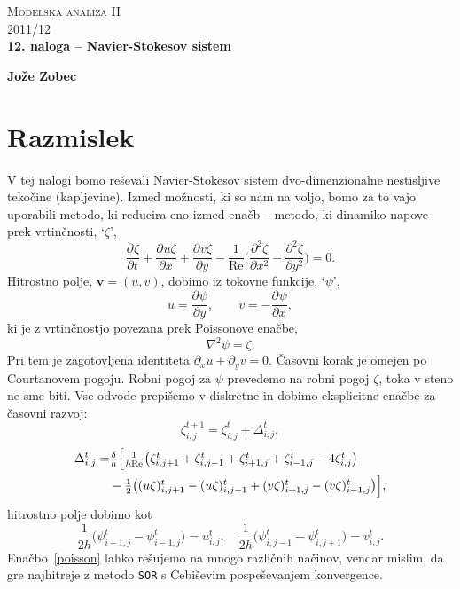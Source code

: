 \documentclass[a4 paper, 12pt]{article}
\renewcommand{\d}{
    \ensuremath{\delta}
}
\newcommand{\der}[3][]{
    \ensuremath{ \frac{\partial^{#1} #2}{\partial #3^{#1}} }
}
\renewcommand{\Re}{
    \ensuremath{\mathrm{Re}}
}
\newcommand{\sfrac}[2]{
    \ensuremath{\textstyle{\frac{#1}{#2}}}
}
\newcommand{\z}{
    \ensuremath{\zeta}
}
\newcommand{\V}{
    \ensuremath{\mathbf{v}}
}
\begin{document}
\begin{center}
\textsc{Modelska analiza II}\\
\textsc{2011/12}\\[0.5cm]
\textbf{12. naloga -- Navier-Stokesov sistem}
\end{center}
\begin{flushright}
\textbf{Jože Zobec}\\
\end{flushright}

\section{Razmislek}

V tej nalogi bomo re\v sevali Navier-Stokesov sistem dvo-dimenzionalne nestisljive
teko\v cine (kapljevine). Izmed mo\v znosti, ki so nam na voljo, bomo za to vajo
uporabili metodo, ki reducira eno izmed ena\v cb -- metodo, ki dinamiko napove prek
vrtin\v cnosti, `$\zeta$',
\[
    \der{\zeta}{t} + \der{u\zeta}{x} + \der{v\zeta}{y} - \frac{1}{\Re}\bigg(\der[2]{\zeta}{x}
        + \der[2]{\zeta}{y}\bigg) = 0.
\]
Hitrostno polje, $\V = (u, v)$, dobimo iz tokovne funkcije, `$\psi$', 
\[
    u = \der{\psi}{y}, \qquad v = -\der{\psi}{x},
\]
ki je z vrtin\v cnostjo povezana prek Poissonove ena\v cbe,
\begin{equation}
    \nabla^2 \psi = \zeta.
    \label{poisson}
\end{equation}
Pri tem je zagotovljena identiteta $\partial_x u + \partial_y v = 0$. \v Casovni korak je omejen
po Courtanovem pogoju. Robni pogoj za $\psi$ prevedemo na robni pogoj $\zeta$, toka v steno ne
sme biti. Vse odvode prepi\v semo v diskretne in dobimo eksplicitne ena\v cbe za \v casovni razvoj:
\begin{equation}
    \z_{i,j}^{t+1} = \z_{i,j}^{t} + \Delta_{i,j}^t,
\end{equation}
\begin{align}
    \Delta_{i,j}^t =& \sfrac{\d}{h}\Big[\sfrac{1}{h\Re}\big(\z^t_{i,j+1} + \z^t_{i,j-1} + \z^t_{i+1,j} +
        \z^t_{i-1,j} - 4\z^t_{i,j}\big) \notag \\
        &- \sfrac{1}{2}\big((u\z)^t_{i,j+1} - (u\z)^t_{i,j-1} + (v\z)^t_{i+1,j} - (v\z)^t_{i-1,j}\big)\Big],
\end{align}
hitrostno polje dobimo kot
\begin{equation}
    \sfrac{1}{2h}\big(\psi^t_{i+1,j} - \psi^t_{i-1,j}\big) = u^t_{i,j}, \quad
    \sfrac{1}{2h}\big(\psi^t_{i,j-1} - \psi^t_{i,j+1}\big) = v^t_{i,j}.
\end{equation}
Ena\v cbo~\eqref{poisson} lahko re\v sujemo na mnogo razli\v cnih na\v cinov, vendar mislim,
da gre najhitreje z metodo {\tt SOR} s \v Cebi\v sevim pospe\v sevanjem konvergence.
\end{document}
